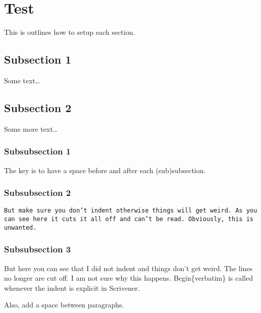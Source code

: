 \label{Chapter-1}

\hypertarget{Section-1.1}{%
\section{Test}\label{Section-1.1}}

This is outlines how to setup each section.

\hypertarget{subsection-1}{%
\subsection{Subsection 1}\label{subsection-1}}

Some text\ldots{}

\hypertarget{subsection-2}{%
\subsection{Subsection 2}\label{subsection-2}}

Some more text\ldots{}

\hypertarget{subsubsection-1}{%
\subsubsection{Subsubsection 1}\label{subsubsection-1}}

The key is to have a space before and after each (sub)subsection.

\hypertarget{subsubsection-2}{%
\subsubsection{Subsubsection 2}\label{subsubsection-2}}

\begin{verbatim}
But make sure you don’t indent otherwise things will get weird. As you can see here it cuts it all off and can’t be read. Obviously, this is unwanted.
\end{verbatim}

\hypertarget{subsubsection-3}{%
\subsubsection{Subsubsection 3}\label{subsubsection-3}}

But here you can see that I did not indent and things don't get weird.
The lines no longer are cut off. I am not sure why this happens.
Begin\{verbatim\} is called whenever the indent is explicit in
Scrivener.

Also, add a space between paragraphs.


